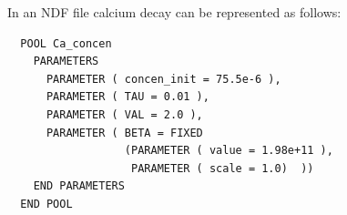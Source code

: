 \documentclass{article}
\begin{document}

In an NDF file calcium decay  can be represented as follows:
\begin{verbatim}
  POOL Ca_concen
    PARAMETERS
      PARAMETER ( concen_init = 75.5e-6 ),
      PARAMETER ( TAU = 0.01 ),
      PARAMETER ( VAL = 2.0 ),
      PARAMETER ( BETA = FIXED
                  (PARAMETER ( value = 1.98e+11 ),
                   PARAMETER ( scale = 1.0)  ))
    END PARAMETERS
  END POOL
\end{verbatim}



\end{document}
